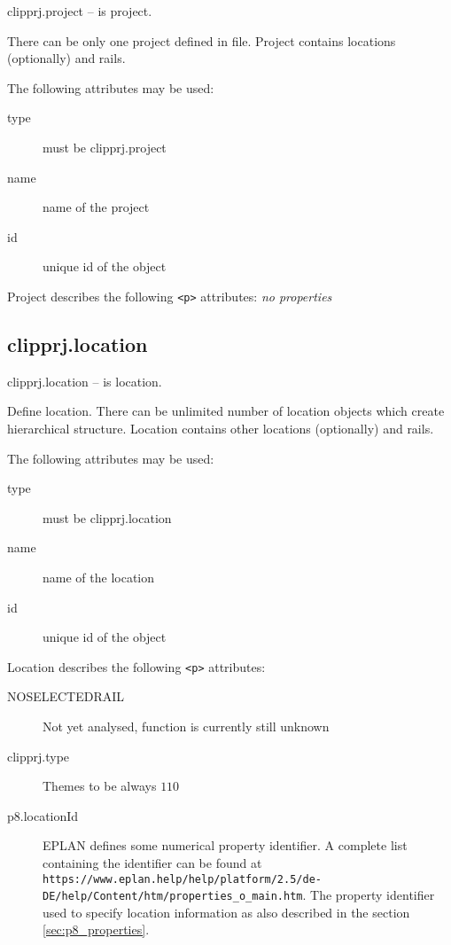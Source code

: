 \documentclass[%
	a4paper,
	oneside,
	listof=numbered,
	parskip=half,
	headsepline=true,
	footsepline=false,
	normalheadings,
	0.7headlines,
	headexclude,
	]{scrbook}
\begin{document}
clipprj.project – is project.

There can be only one project defined in file.
Project contains locations (optionally) and rails.

The following attributes may be used:

\begin{description}
	\item[type] must be clipprj.project
	\item[name] name of the project
	\item[id] unique id of the object
\end{description}
 
Project describes the following \verb|<p>| attributes: \emph{no properties}

\subsection{clipprj.location}
 
clipprj.location – is location. 

Define location.
There can be unlimited number of location objects which create hierarchical structure.
Location contains other locations (optionally) and rails.

The following attributes may be used:

\begin{description}
	\item[type] must be clipprj.location
	\item[name] name of the location
	\item[id] unique id of the object
\end{description}

Location describes the following \verb|<p>| attributes:

\begin{description}
	\item[{NO\textunderscore SELECTED\textunderscore RAIL}] Not yet analysed, function is currently still unknown
	\item[clipprj.type] Themes to be always $110$
	\item[p8.locationId] EPLAN defines some numerical property identifier.
	A complete list containing the identifier can be found at \verb|https://www.eplan.help/help/platform/2.5/de-DE/help/Content/htm/properties_o_main.htm|.
	The property identifier used to specify location information as also described in the section \ref{sec:p8_properties}.
\end{description}
\end{document}
